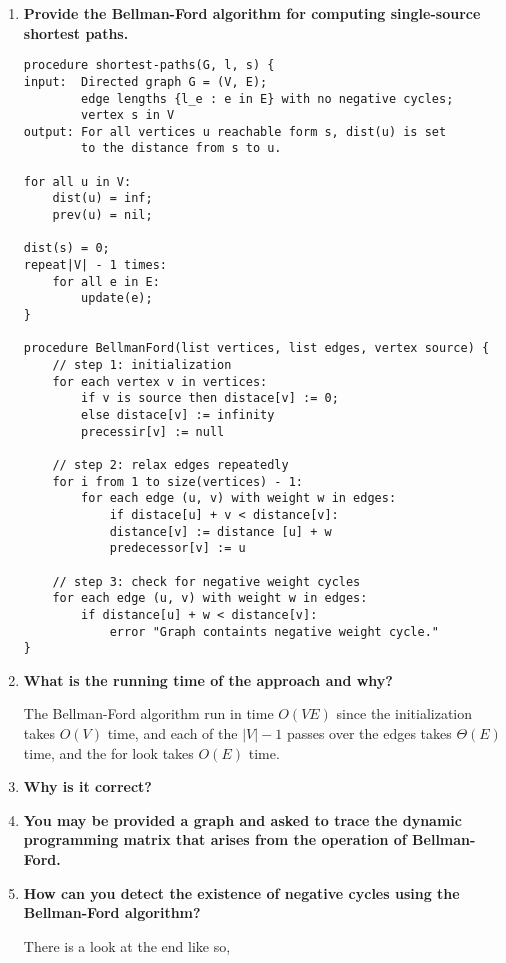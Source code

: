 \documentclass[a4paper,11pt]{article}
\begin{document}
\begin{enumerate}
\def\labelenumi{\arabic{enumi}.}
\item
  \textbf{Provide the Bellman-Ford algorithm for computing single-source
  shortest paths.}

\begin{verbatim}
procedure shortest-paths(G, l, s) { 
input:  Directed graph G = (V, E);
        edge lengths {l_e : e in E} with no negative cycles;
        vertex s in V
output: For all vertices u reachable form s, dist(u) is set
        to the distance from s to u.

for all u in V:
    dist(u) = inf;
    prev(u) = nil;

dist(s) = 0;
repeat|V| - 1 times:
    for all e in E:
        update(e);
}

procedure BellmanFord(list vertices, list edges, vertex source) {
    // step 1: initialization
    for each vertex v in vertices:
        if v is source then distace[v] := 0;
        else distace[v] := infinity
        precessir[v] := null

    // step 2: relax edges repeatedly
    for i from 1 to size(vertices) - 1:
        for each edge (u, v) with weight w in edges:
            if distace[u] + v < distance[v]:
            distance[v] := distance [u] + w
            predecessor[v] := u

    // step 3: check for negative weight cycles
    for each edge (u, v) with weight w in edges:
        if distance[u] + w < distance[v]:
            error "Graph containts negative weight cycle."
}
\end{verbatim}
\item
  \textbf{What is the running time of the approach and why?}

  The Bellman-Ford algorithm run in time $O(V E)$ since the
  initialization takes $O(V)$ time, and each of the $|V| - 1$ passes
  over the edges takes $\Theta(E)$ time, and the for look takes $O(E)$
  time.
\item
  \textbf{Why is it correct?}
\item
  \textbf{You may be provided a graph and asked to trace the dynamic
  programming matrix that arises from the operation of Bellman-Ford.}
\item
  \textbf{How can you detect the existence of negative cycles using the
  Bellman-Ford algorithm?}

  There is a look at the end like so,


\end{enumerate}
\end{document}
